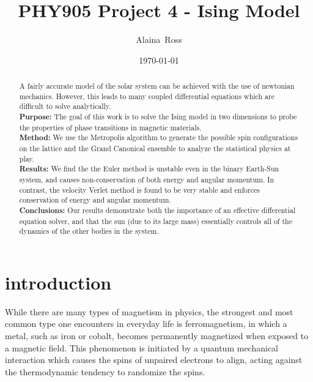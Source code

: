 \documentclass[prc,amsmath,twocolumn,superscriptaddress]{revtex4}
\begin{document}
  \newcommand {\nc} {\newcommand}
  \nc {\Sec} [1] {Sec.~\ref{#1}}
  \nc {\IR} [1] {\textcolor{red}{#1}} 

\title{PHY905 Project 4 - Ising Model}


\author{Alaina~Ross}

\date{\today}


\begin{abstract}
  A fairly accurate model of the solar system can be achieved with the use of newtonian mechanics. However, this leads to many coupled differential equations which are difficult to solve analytically.
\\ {\bf Purpose:} The goal of this work is to solve the Ising model in two dimensions to probe the properties of phase transitions in magnetic materials.
\\ {\bf Method:} We use the Metropolis algorithm to generate the possible spin configurations on the lattice and the Grand Canonical ensemble to analyze the statistical physics at play.
\\ {\bf Results:} We find the the Euler method is unstable even in the binary Earth-Sun system, and causes non-conservation of both energy and angular momentum. In contrast, the velocity Verlet method is found to be very stable and enforces conservation of energy and angular momentum.
 \\ {\bf Conclusions:} Our results demonstrate both the importance of an effective differential equation solver, and that the sun (due to its large mass) essentially controls all of the dynamics of the other bodies in the system. 
\end{abstract}


\maketitle

\section{introduction}
\label{intro}
While there are many types of magnetism in physics, the strongest and most common type one encounters in everyday life is ferromagnetism, in which a metal, such as iron or cobalt, becomes permanently magnetized when exposed to a magnetic field. This phenomenon is initiated by a quantum mechanical interaction which causes the spins of unpaired electrons to align, acting against the thermodynamic tendency to randomize the spins.
\end{document}
